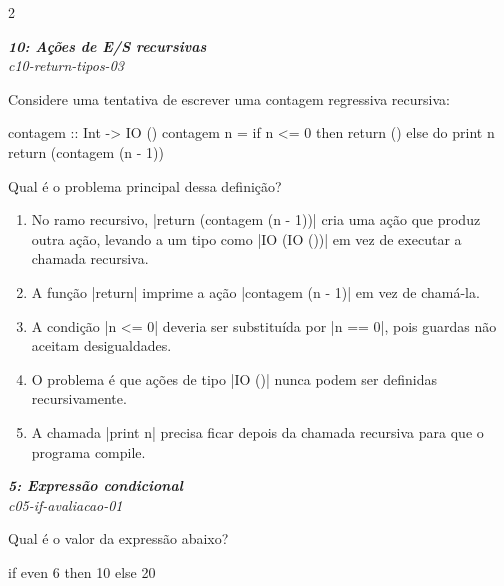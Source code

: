 \documentclass[a4paper,10pt,brazil]{article}
\begin{document}
\begin{multicols}{2}
\begin{enumerate}
\end{enumerate}

\begin{flushright}
  \footnotesize
  \textit{\textbf{10: Ações de E/S recursivas}}\\
  \textit{c10-return-tipos-03}\\

\end{flushright}
Considere uma tentativa de escrever uma contagem regressiva recursiva:

\begin{haskellcode}
contagem :: Int -> IO ()
contagem n =
  if n <= 0
    then return ()
    else do
      print n
      return (contagem (n - 1))
\end{haskellcode}

Qual é o problema principal dessa definição?

\begin{enumerate}
  \item No ramo recursivo, \haskellinline|return (contagem (n - 1))| cria uma ação que produz outra ação, levando a um tipo como \haskellinline|IO (IO ())| em vez de executar a chamada recursiva.

  \item A função \haskellinline|return| imprime a ação \haskellinline|contagem (n - 1)| em vez de chamá-la.

  \item A condição \haskellinline|n <= 0| deveria ser substituída por \haskellinline|n == 0|, pois guardas não aceitam desigualdades.

  \item O problema é que ações de tipo \haskellinline|IO ()| nunca podem ser definidas recursivamente.

  \item A chamada \haskellinline|print n| precisa ficar depois da chamada recursiva para que o programa compile.


\end{enumerate}

\begin{flushright}
  \footnotesize
  \textit{\textbf{5: Expressão condicional}}\\
  \textit{c05-if-avaliacao-01}\\

\end{flushright}
Qual é o valor da expressão abaixo?
\begin{haskellcode}
if even 6 then 10 else 20
\end{haskellcode}


\end{multicols}
\end{document}
